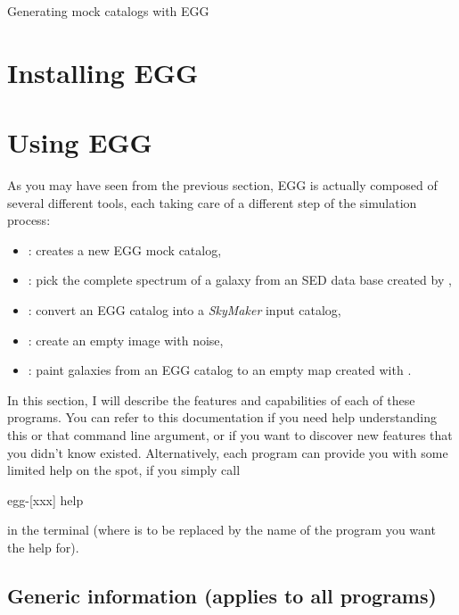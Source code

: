 \documentclass[12pt,a4paper]{article}
\newcommand{\egg}{\textsc{EGG}\xspace}
\newcommand{\skymaker}{\textit{SkyMaker}\xspace}
\begin{document}

\begin{center}
{\huge Generating mock catalogs with \egg}
\end{center}

\tableofcontents

\section{Installing \egg}



\section{Using \egg}

As you may have seen from the previous section, \egg is actually composed of several different tools, each taking care of a different step of the simulation process:
\begin{itemize}
\item {}: creates a new \egg mock catalog,
\item {}: pick the complete spectrum of a galaxy from an SED data base created by ,
\item {}: convert an \egg catalog into a \skymaker input catalog,
\item {}: create an empty image with noise,
\item {}: paint galaxies from an \egg catalog to an empty map created with .
\end{itemize}

In this section, I will describe the features and capabilities of each of these programs. You can refer to this documentation if you need help understanding this or that command line argument, or if you want to discover new features that you didn't know existed. Alternatively, each program can provide you with some limited help on the spot, if you simply call
\begin{bashcode}
egg-[xxx] help
\end{bashcode}
in the terminal (where \bashinline{[xxx]} is to be replaced by the name of the program you want the help for).

\subsection{Generic information (applies to all programs)}
\end{document}

